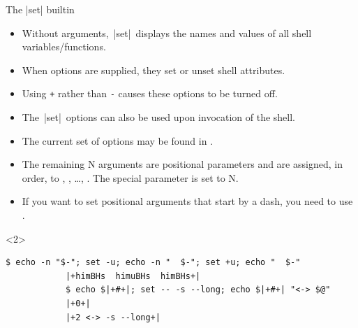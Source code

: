 \begin{frame}[fragile]{The \bash|set| builtin}{}
    \vspace{-2mm}
    \begin{itemize}
        \item Without arguments, \,\bash|set|\, displays the names and values of all shell variables/functions.
        \item When options are supplied, they set or unset shell attributes.
        \item Using \texttt{+} rather than \texttt{-} causes these options to be turned off.
        \item The \,\bash|set|\, options can also be used upon invocation of the shell.
        \item The current set of options may be found in \PB{\texttt{\$-}}.
        \item The remaining N arguments are positional parameters and are assigned, in order, to , , \ldots, .
              The special parameter \PB{\texttt{\#}} is set to N.
        \item If you want to set positional arguments that start by a dash, you need to use \PB{\texttt{-{}-}}.
    \end{itemize}
    \begin{uncoverenv}<2>
        \begin{lstlisting}[style=myBash, aboveskip=2mm]
            $ echo -n "$-"; set -u; echo -n "  $-"; set +u; echo "  $-"
            |+himBHs  himuBHs  himBHs+|
            $ echo $|+#+|; set -- -s --long; echo $|+#+| "<-> $@"
            |+0+|
            |+2 <-> -s --long+|
        \end{lstlisting}
    \end{uncoverenv}
\end{frame}
